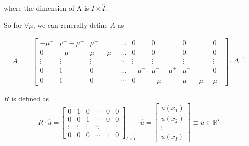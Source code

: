 \documentclass[11pt]{article}
\newcommand{\R}{\ensuremath{\mathbb{R}}}
\begin{document}
where the dimension of A is $I\times\hat{I}$.

So for $\forall\mu$, we can generally define $A$ as

\begin{align}
A &= \begin{bmatrix}
-\mu^-&\mu^--\mu^+&\mu^+&\dots&0&0&0&0\\
0&-\mu^-&\mu^--\mu^+&\dots&0&0&0&0\\
\vdots&\vdots&\vdots&\ddots&\vdots&\vdots&\vdots&\vdots\\
0&0&0&\dots&-\mu^-&\mu^--\mu^+&\mu^+&0\\
0&0&0&\cdots&0&-\mu^-&\mu^--\mu^+&\mu^+
\end{bmatrix}\cdot \Delta^{-1}\nonumber
\end{align}

$R$ is defined as 
\begin{equation}
R\cdot \hat{u} =\begin{bmatrix}
0&1&0&\cdots&0&0\\
0&0&1&\cdots&0&0\\
\vdots&\vdots&\vdots&\ddots&\vdots&\vdots\\
0&0&0&\cdots&1&0
\end{bmatrix}_{I\times\hat{I}}\cdot \hat{u}		 
=\begin{bmatrix}
u(x_1)\\
u(x_2)\\
\vdots\\
u(x_I)
\end{bmatrix} \equiv u\in \R^{I} 
\end{equation}
\end{document}
